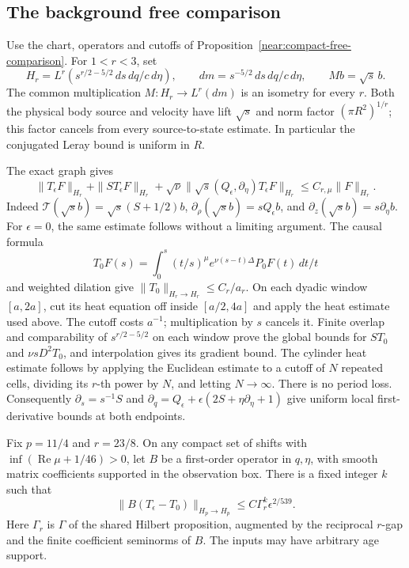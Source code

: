 \subsection{The background free comparison}

Use the chart, operators and cutoffs of
Proposition~\ref{near:compact-free-comparison}. For \(1<r<3\), set
\[
 H_r=L^r(s^{r/2-5/2}\,ds\,dq/c\,d\eta),\qquad
 dm=s^{-5/2}\,ds\,dq/c\,d\eta,\qquad Mb=\sqrt{s}\,b.
\]
The common multiplication \(M:H_r\to L^r(dm)\) is an isometry for
every \(r\). Both the physical body source and velocity have lift
\(\sqrt{s}\) and norm factor \((\pi R^2)^{1/r}\); this factor
cancels from every source-to-state estimate. In particular the
conjugated Leray bound is uniform in \(R\).

The exact graph gives
\begin{equation}\label{bg:profile-graph}
 \|T_\epsilon F\|_{H_r}+\|ST_\epsilon F\|_{H_r}
 +\sqrt\nu\|\sqrt{s}(Q_\epsilon,\partial_\eta)T_\epsilon F\|_{H_r}
 \le C_{r,\mu}\|F\|_{H_r}.
\end{equation}
Indeed \(\mathcal T(\sqrt{s}b)=\sqrt{s}(S+1/2)b\),
\(\partial_\rho(\sqrt{s}b)=sQ_\epsilon b\), and
\(\partial_z(\sqrt{s}b)=s\partial_\eta b\).
For \(\epsilon=0\), the same estimate follows without a limiting
argument. The causal formula
\[
 T_0F(s)=\int_0^s(t/s)^\mu e^{\nu(s-t)\Delta}P_0F(t)\,dt/t
\]
and weighted dilation give \(\|T_0\|_{H_r\to H_r}\le C_r/a_r\).
On each dyadic window \([a,2a]\), cut its heat equation off inside
\([a/2,4a]\) and apply the heat estimate used above. The cutoff costs
\(a^{-1}\); multiplication by \(s\) cancels it. Finite overlap and
comparability of \(s^{r/2-5/2}\) on each window prove the global bounds
for \(ST_0\) and \(\nu sD^2T_0\), and interpolation gives its gradient
bound. The cylinder heat estimate follows by applying the Euclidean
estimate to a cutoff of \(N\) repeated cells, dividing its \(r\)-th
power by \(N\), and letting \(N\to\infty\). There is no period loss.
Consequently \(\partial_s=s^{-1}S\) and
\(\partial_q=Q_\epsilon+\epsilon(2S+\eta\partial_\eta+1)\)
give uniform local first-derivative bounds at both endpoints.

\begin{proposition}\label{bg:lp-free-comparison}
Fix \(p=11/4\) and \(r=23/8\). On any compact set of shifts with
\(\inf(\operatorname{Re}\mu+1/46)>0\), let \(B\) be a first-order
operator in \(q,\eta\), with smooth matrix coefficients supported
in the observation box. There is a fixed integer \(k\) such that
\begin{equation}\label{bg:lp-comparison-rate}
 \|B(T_\epsilon-T_0)\|_{H_p\to H_p}
       \le C\Gamma_r^k\epsilon^{2/539}.
\end{equation}
Here \(\Gamma_r\) is \(\Gamma\) of the shared Hilbert proposition,
augmented by the reciprocal \(r\)-gap and the finite coefficient
seminorms of \(B\). The inputs may have arbitrary age support.
\end{proposition}

